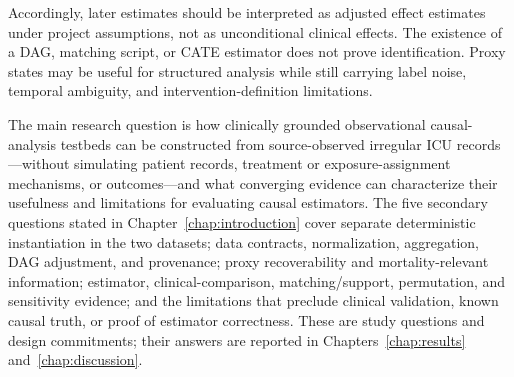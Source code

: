 Accordingly, later estimates should be interpreted as adjusted effect estimates under project assumptions, not as unconditional clinical effects.  The existence of a DAG, matching script, or CATE estimator does not prove identification.  Proxy states may be useful for structured analysis while still carrying label noise, temporal ambiguity, and intervention-definition limitations.

The main research question is how clinically grounded observational causal-analysis testbeds can be constructed from source-observed irregular ICU records---without simulating patient records, treatment or exposure-assignment mechanisms, or outcomes---and what converging evidence can characterize their usefulness and limitations for evaluating causal estimators.  The five secondary questions stated in Chapter~\ref{chap:introduction} cover separate deterministic instantiation in the two datasets; data contracts, normalization, aggregation, DAG adjustment, and provenance; proxy recoverability and mortality-relevant information; estimator, clinical-comparison, matching/support, permutation, and sensitivity evidence; and the limitations that preclude clinical validation, known causal truth, or proof of estimator correctness.  These are study questions and design commitments; their answers are reported in Chapters~\ref{chap:results} and~\ref{chap:discussion}.
